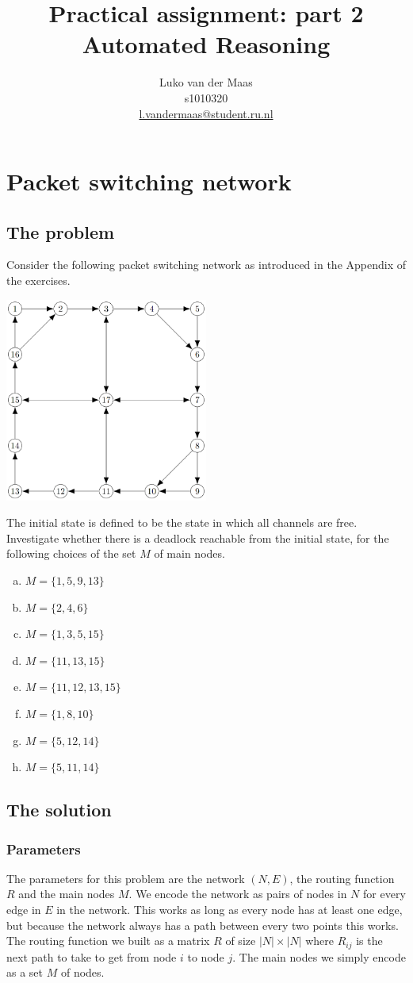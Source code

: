 \documentclass[12pt]{scrartcl}
\title{Practical assignment: part 2\\Automated Reasoning}
\author{Luko van der Maas\\s1010320\\\href{mailto:l.vandermaas@student.ru.nl}{l.vandermaas@student.ru.nl} }
\begin{document}
\maketitle

\section{Packet switching network}
\subsection{The problem}
Consider the following packet switching network as introduced in the Appendix of the exercises.
\begin{center}
    \includegraphics[width=0.5\textwidth]{network.png}
\end{center}
The initial state is defined to be the state in which all channels are free. Investigate whether there is a deadlock reachable from the initial state, for the following choices of the set $M$ of main nodes.
\begin{enumerate}[(a)]
    \item $M=\{1,5,9,13\}$
    \item $M=\{2,4,6\}$
    \item $M=\{1,3,5,15\}$
    \item $M=\{11,13,15\}$
    \item $M=\{11,12,13,15\}$
    \item $M=\{1,8,10\}$
    \item $M=\{5,12,14\}$
    \item $M=\{5,11,14\}$
\end{enumerate}

\subsection{The solution}
\subsubsection{Parameters}
The parameters for this problem are the network $(N,E)$, the routing function $R$ and the main nodes $M$.
We encode the network as pairs of nodes in $N$ for every edge in $E$ in the network. This works as long as every node has at least one edge, but because the network always has a path between every two points this works. The routing function we built as a matrix $R$ of size $|N| \times |N|$ where $R_{ij}$ is the next path to take to get from node $i$ to node $j$. The main nodes we simply encode as a set $M$ of nodes.
\end{document}
